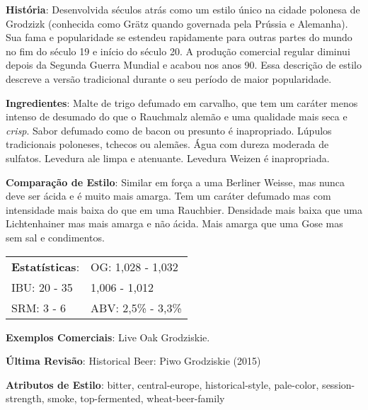 \textbf{História}: Desenvolvida séculos atrás como um estilo único na cidade polonesa de Grodzizk (conhecida como Grätz quando governada pela Prússia e Alemanha). Sua fama e popularidade se estendeu rapidamente para outras partes do mundo no fim do século 19 e início do século 20. A produção comercial regular diminui depois da Segunda Guerra Mundial e acabou nos anos 90. Essa descrição de estilo descreve a versão tradicional durante o seu período de maior popularidade.

\textbf{Ingredientes}: Malte de trigo defumado em carvalho, que tem um caráter menos intenso de desumado do que o Rauchmalz alemão e uma qualidade mais seca e \textit{crisp}. Sabor defumado como de bacon ou presunto é inapropriado. Lúpulos tradicionais poloneses, tchecos ou alemães. Água com dureza moderada de sulfatos. Levedura ale limpa e atenuante. Levedura Weizen é inapropriada.

\textbf{Comparação de Estilo}: Similar em força a uma Berliner Weisse, mas nunca deve ser ácida e é muito mais amarga. Tem um caráter defumado mas com intensidade mais baixa do que em uma Rauchbier. Densidade mais baixa que uma Lichtenhainer mas mais amarga e não ácida. Mais amarga que uma Gose mas sem sal e condimentos.

\begin{tabular}{@{}p{35mm}p{35mm}@{}}
  \textbf{Estatísticas}: & OG: 1,028 - 1,032 \\
  IBU: 20 - 35  & 1,006 - 1,012  \\
  SRM: 3 - 6 & ABV: 2,5\% - 3,3\%
\end{tabular}

\textbf{Exemplos Comerciais}: Live Oak Grodziskie.

\textbf{Última Revisão}: Historical Beer: Piwo Grodziskie (2015)

\textbf{Atributos de Estilo}: bitter, central-europe, historical-style, pale-color, session-strength, smoke, top-fermented, wheat-beer-family
